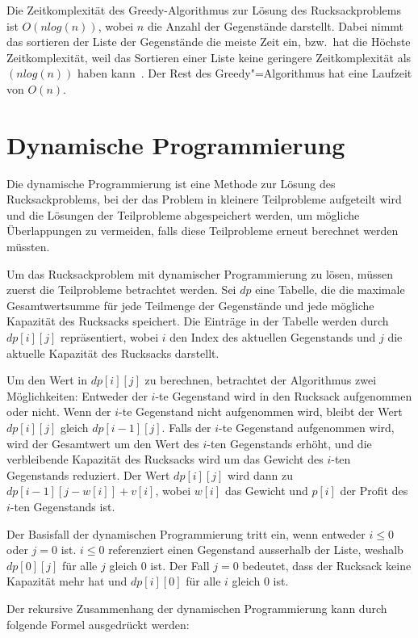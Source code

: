 Die Zeitkomplexität des Greedy-Algorithmus zur Lösung des 
Rucksackproblems ist $O(nlog(n))$, 
wobei $n$ die Anzahl der Gegenstände darstellt. Dabei nimmt das 
sortieren der Liste der Gegenstände die meiste Zeit ein, bzw.\ hat 
die Höchste Zeitkomplexität, weil das Sortieren einer Liste 
keine geringere Zeitkomplexität als $(nlog(n))$ haben kann\ \cite[vgl. S. 191--193]{cormen2022introduction}.
Der Rest des Greedy"=Algorithmus hat eine 
Laufzeit von $O(n)$.\ \cite[vgl. S. 425ff.]{cormen2022introduction}

\section{Dynamische Programmierung}
Die dynamische Programmierung ist eine Methode zur 
Lösung des Rucksackproblems, bei der das Problem in kleinere 
Teilprobleme aufgeteilt wird und die Lösungen der Teilprobleme 
abgespeichert werden, um mögliche Überlappungen zu vermeiden, falls 
diese Teilprobleme erneut berechnet werden müssten.

Um das Rucksackproblem mit dynamischer Programmierung zu 
lösen, müssen zuerst die Teilprobleme betrachtet werden. 
Sei $dp$ eine Tabelle, die die maximale 
Gesamtwertsumme für jede Teilmenge der Gegenstände und jede 
mögliche Kapazität des Rucksacks speichert. Die Einträge in 
der Tabelle werden durch $dp[i][j]$ repräsentiert, wobei $i$ den 
Index des aktuellen Gegenstands und $j$ die aktuelle Kapazität 
des Rucksacks darstellt.

Um den Wert in $dp[i][j]$ zu berechnen, betrachtet der Algorithmus 
zwei Möglichkeiten: Entweder der $i$-te Gegenstand wird in den 
Rucksack aufgenommen oder nicht. Wenn der $i$-te Gegenstand 
nicht aufgenommen wird, bleibt der Wert $dp[i][j]$ gleich 
$dp[i-1][j]$. Falls der $i$-te Gegenstand aufgenommen wird, wird 
der Gesamtwert um den Wert des $i$-ten Gegenstands erhöht, und 
die verbleibende Kapazität des Rucksacks wird um das Gewicht 
des $i$-ten Gegenstands reduziert. Der Wert $dp[i][j]$ wird dann 
zu $dp[i-1][j-w[i]] + v[i]$, wobei $w[i]$ das Gewicht und $p[i]$ 
der Profit des $i$-ten Gegenstands ist.

Der Basisfall der dynamischen Programmierung tritt ein, wenn 
entweder $i \le 0$ oder $j = 0$ ist. $i \le 0$ referenziert einen 
Gegenstand ausserhalb der Liste, weshalb $dp[0][j]$ für alle $j$ gleich $0$ ist. 
Der Fall $j = 0$ bedeutet, 
dass der Rucksack keine Kapazität mehr hat und $dp[i][0]$ 
für alle $i$ gleich $0$ ist.

Der rekursive Zusammenhang der dynamischen Programmierung 
kann durch folgende Formel ausgedrückt werden:

